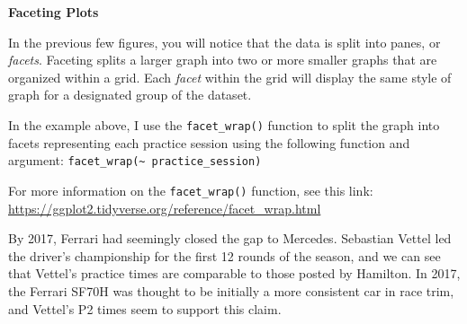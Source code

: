 \documentclass[
]{book}
\begin{document}
\begin{blackbox}

\begin{center}
\textbf{Faceting Plots}

\end{center}

In the previous few figures, you will notice that the data is split into panes, or \emph{facets}.
Faceting splits a larger graph into two or more smaller graphs that are organized within a grid. Each \emph{facet} within the grid will display the same style of graph for a designated group of the dataset.

In the example above, I use the \texttt{facet\_wrap()} function to split the graph into facets representing each practice session using the following function and argument: \texttt{facet\_wrap(\textasciitilde{}\ practice\_session)}

For more information on the \texttt{facet\_wrap()} function, see this link: \url{https://ggplot2.tidyverse.org/reference/facet_wrap.html}

\end{blackbox}

By 2017, Ferrari had seemingly closed the gap to Mercedes. Sebastian Vettel led the driver's championship for the first 12 rounds of the season, and we can see that Vettel's practice times are comparable to those posted by Hamilton. In 2017, the Ferrari SF70H was thought to be initially a more consistent car in race trim, and Vettel's P2 times seem to support this claim.
\end{document}
